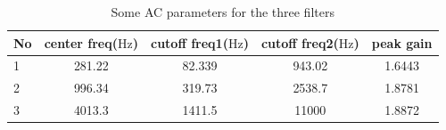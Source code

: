 \documentclass{IEEEtran}
\begin{document}
	\begin{table}[!htbp]
		\centering
		\caption{Some AC parameters for the three filters}
		\begin{tabular}{lcccc}
			\toprule
			No &center freq($\si{\hertz}$) &cutoff freq1($\si{\hertz}$)&cutoff freq2($ \si{\hertz} $)&peak gain\\
			\midrule
			1	&281.22	&82.339	&943.02	&1.6443\\
			2	&996.34	&319.73	&2538.7	&1.8781\\
			3	&4013.3	&1411.5	&11000	&1.8872\\
			\bottomrule
		\end{tabular}
		\label{tab:ACpara}
	\end{table}	
\end{document}
